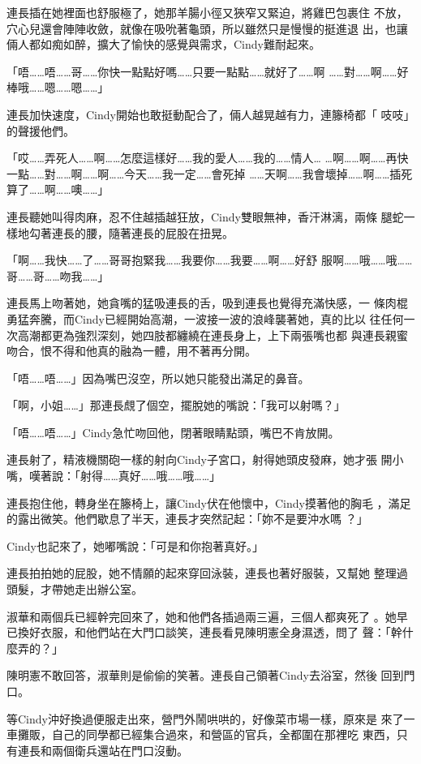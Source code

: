 連長插在她裡面也舒服極了，她那羊腸小徑又狹窄又緊迫，將雞巴包裹住
不放，穴心兒還會陣陣收斂，就像在吸吮著龜頭，所以雖然只是慢慢的挺進退
出，也讓倆人都如痴如醉，擴大了愉快的感覺與需求，Cindy難耐起來。

「唔……唔……哥……你快一點點好嗎……只要一點點……就好了……啊
……對……啊……好棒哦……嗯……嗯……」

連長加快速度，Cindy開始也敢挺動配合了，倆人越晃越有力，連籐椅都「
吱吱」的聲援他們。

「哎……弄死人……啊……怎麼這樣好……我的愛人……我的……情人…
…啊……啊……再快一點……對……啊……啊……今天……我一定……會死掉
……天啊……我會壞掉……啊……插死算了……啊……噢……」

連長聽她叫得肉麻，忍不住越插越狂放，Cindy雙眼無神，香汗淋漓，兩條
腿蛇一樣地勾著連長的腰，隨著連長的屁股在扭晃。

「啊……我快……了……哥哥抱緊我……我要你……我要……啊……好舒
服啊……哦……哦……哥……哥……吻我……」

連長馬上吻著她，她貪嘴的猛吸連長的舌，吸到連長也覺得充滿快感，一
條肉棍勇猛奔騰，而Cindy已經開始高潮，一波接一波的浪峰襲著她，真的比以
往任何一次高潮都更為強烈深刻，她四肢都纏繞在連長身上，上下兩張嘴也都
與連長親蜜吻合，恨不得和他真的融為一體，用不著再分開。

「唔……唔……」因為嘴巴沒空，所以她只能發出滿足的鼻音。

「啊，小姐……」那連長覤了個空，擺脫她的嘴說：「我可以射嗎？」

「唔……唔……」Cindy急忙吻回他，閉著眼睛點頭，嘴巴不肯放開。

連長射了，精液機關砲一樣的射向Cindy子宮口，射得她頭皮發麻，她才張
開小嘴，嘆著說：「射得……真好……哦……哦……」

連長抱住他，轉身坐在籐椅上，讓Cindy伏在他懷中，Cindy摸著他的胸毛
，滿足的露出微笑。他們歇息了半天，連長才突然記起：「妳不是要沖水嗎
？」

Cindy也記來了，她嘟嘴說：「可是和你抱著真好。」

連長拍拍她的屁股，她不情願的起來穿回泳裝，連長也著好服裝，又幫她
整理過頭髮，才帶她走出辦公室。

淑華和兩個兵已經幹完回來了，她和他們各插過兩三遍，三個人都爽死了
。她早已換好衣服，和他們站在大門口談笑，連長看見陳明憲全身濕透，問了
聲：「幹什麼弄的？」

陳明憲不敢回答，淑華則是偷偷的笑著。連長自己領著Cindy去浴室，然後
回到門口。

等Cindy沖好換過便服走出來，營門外鬧哄哄的，好像菜市場一樣，原來是
來了一車攤販，自己的同學都已經集合過來，和營區的官兵，全都圍在那裡吃
東西，只有連長和兩個衛兵還站在門口沒動。


